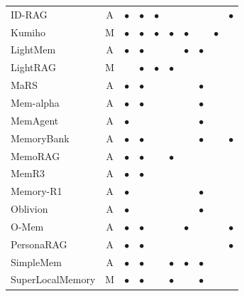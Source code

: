 \begin{table}[!t]
\begin{tabular}{@{}lc cccccccc@{}}
ID-RAG               & A & $\bullet$ & $\bullet$ & $\bullet$ &           &           &           &           & $\bullet$ \\
Kumiho               & M & $\bullet$ & $\bullet$ & $\bullet$ & $\bullet$ & $\bullet$ &           & $\bullet$ &           \\
LightMem             & A & $\bullet$ & $\bullet$ &           &           & $\bullet$ & $\bullet$ &           &           \\
LightRAG             & M &           & $\bullet$ & $\bullet$ & $\bullet$ &           &           &           &           \\
MaRS                 & A & $\bullet$ & $\bullet$ &           &           &           & $\bullet$ &           &           \\
Mem-alpha            & A & $\bullet$ & $\bullet$ &           &           &           & $\bullet$ &           &           \\
MemAgent             & A & $\bullet$ &           &           &           &           & $\bullet$ &           &           \\
MemoryBank           & A & $\bullet$ & $\bullet$ &           &           &           & $\bullet$ &           & $\bullet$ \\
MemoRAG              & A & $\bullet$ & $\bullet$ &           & $\bullet$ &           &           &           &           \\
MemR3                & A & $\bullet$ & $\bullet$ &           &           &           &           &           &           \\
Memory-R1            & A & $\bullet$ &           &           &           &           & $\bullet$ &           &           \\
Oblivion             & A & $\bullet$ &           &           &           &           & $\bullet$ &           &           \\
O-Mem                & A & $\bullet$ & $\bullet$ &           &           & $\bullet$ &           &           & $\bullet$ \\
PersonaRAG           & A & $\bullet$ & $\bullet$ &           &           &           &           &           & $\bullet$ \\
SimpleMem            & A & $\bullet$ & $\bullet$ &           & $\bullet$ & $\bullet$ & $\bullet$ &           &           \\
SuperLocalMemory     & M & $\bullet$ & $\bullet$ &           & $\bullet$ &           & $\bullet$ &           &           \\

\end{tabular}
\end{table}
